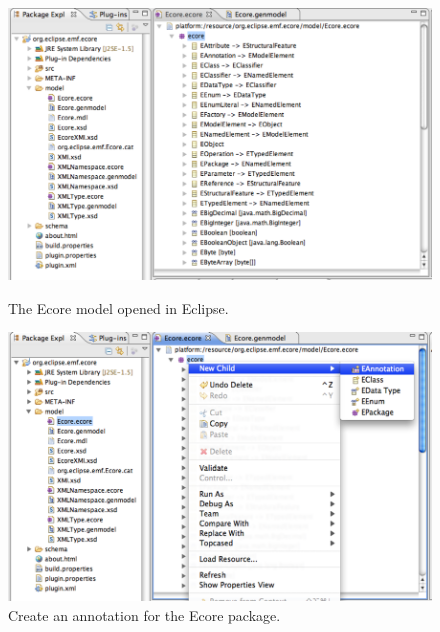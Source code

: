 \begin{figure}[!p]
	\centering
	\includegraphics[width=1.0\linewidth]{figures/pivotModelAdaption/EcoreOverview}
	\caption{The Ecore model opened in Eclipse.}
	\label{pic:pivotModelAdaptation:EcoreOverview}

  \vspace{3.0em}
  
	\centering
	\includegraphics[width=1.0\linewidth]{figures/pivotModelAdaption/CreateAnnotation}
	\caption{Create an annotation for the Ecore package.}
	\label{pic:pivotModelAdaption:CreateAnnotation}
\end{figure}

